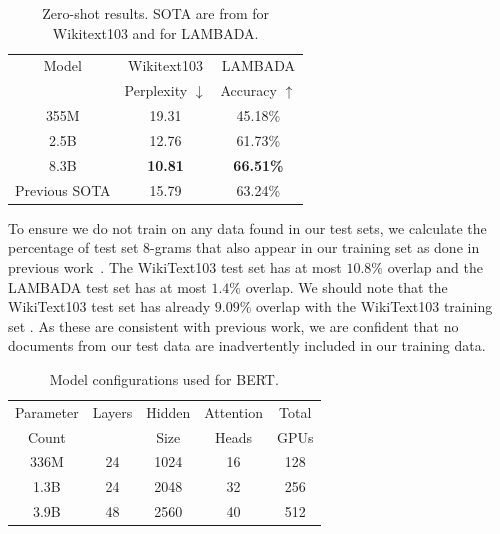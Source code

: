 \begin{table}
\begin{center}
\caption{Zero-shot results. SOTA are from \cite{WIKI103SOTA} for Wikitext103 and \cite{Radford2019GPT2} for LAMBADA.}
\label{tab:model_results}
\begin{tabular}{c|c|c} \hline \hline
Model & Wikitext103 & LAMBADA   \\
 & Perplexity $\downarrow$ & Accuracy $\uparrow$  \\ \hline
355M & 19.31 & 45.18\%  \\ 
2.5B & 12.76 & 61.73\%  \\ 
8.3B & \textbf{10.81} & \textbf{66.51\%}  \\ \hline 
Previous SOTA & 15.79 & 63.24\% \\
\end{tabular}
\end{center}
\end{table}
To ensure we do not train on any data found in our test sets, we calculate the percentage of test set 8-grams that also appear in our training set as done in previous work~\cite{Radford2019GPT2}. %
The WikiText103 test set has at most $10.8\%$ overlap and the LAMBADA test set \citep{lambada} has at most $1.4\%$ overlap. We should note that the WikiText103 test set has already $9.09\%$ overlap with the WikiText103 training set \cite{Radford2019GPT2}. As these are consistent with previous work, 
we are confident that no documents from our test data are inadvertently included in our training data.

\begin{table}
\footnotesize
\begin{center}
\caption{Model configurations used for BERT.}
\label{tab:bert_model_size}
\begin{tabular}{c|c|c|c|c} \hline \hline
Parameter & Layers & Hidden & Attention & Total \\
Count     &        & Size   & Heads     & GPUs  \\ \hline
336M      & 24     & 1024   & 16        & 128   \\ 
1.3B      & 24     & 2048   & 32        & 256   \\ 
3.9B      & 48     & 2560   & 40        & 512   \\ \hline 
\end{tabular}
\end{center}
\end{table}

